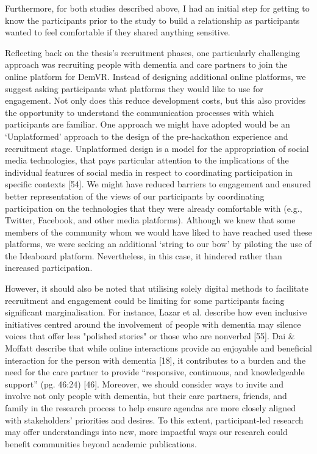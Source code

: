 Furthermore, for both studies described above, I had an initial step for getting to know the participants prior to the study to build a relationship as participants wanted to feel comfortable if they shared anything sensitive.

Reflecting back on the thesis's recruitment phases, one particularly challenging approach was recruiting people with dementia and care partners to join the online platform for DemVR. Instead of designing additional online platforms, we suggest asking participants what platforms they would like to use for engagement. Not only does this reduce development costs, but this also provides the opportunity to understand the communication processes with which participants are familiar. One approach we might have adopted would be an ‘Unplatformed’ approach to the design of the pre-hackathon experience and recruitment stage. Unplatformed design is a model for the appropriation of social media technologies, that pays particular attention to the implications of the individual features of social media in respect to coordinating participation in specific contexts [54]. We might have reduced barriers to engagement and ensured better representation of the views of our participants by coordinating participation on the technologies that they were already comfortable with (e.g., Twitter, Facebook, and other media platforms). Although we knew that some members of the community whom we would have liked to have reached used these platforms, we were seeking an additional ‘string to our bow’ by piloting the use of the Ideaboard platform. Nevertheless, in this case, it hindered rather than increased participation. 

However, it should also be noted that utilising solely digital methods to facilitate recruitment and engagement could be limiting for some participants facing significant marginalisation. For instance, Lazar et al. describe how even inclusive initiatives centred around the involvement of people with dementia may silence voices that offer less "polished stories" or those who are nonverbal [55]. Dai \& Moffatt describe that while online interactions provide an enjoyable and beneficial interaction for the person with dementia [18], it contributes to a burden and the need for the care partner to provide “responsive, continuous, and knowledgeable support” (pg. 46:24) [46]. Moreover, we should consider ways to invite and involve not only people with dementia, but their care partners, friends, and family in the research process to help ensure agendas are more closely aligned with stakeholders’ priorities and desires. To this extent, participant-led research may offer understandings into new, more impactful ways our research could benefit communities beyond academic publications.

